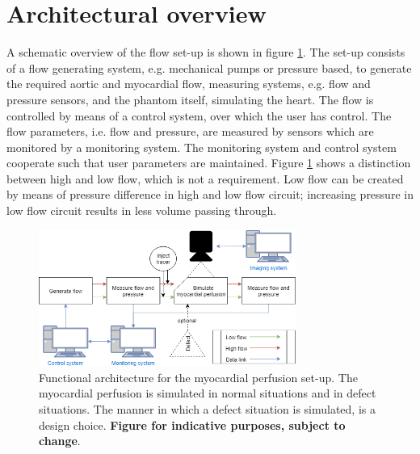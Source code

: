 \section{Architectural overview}
A schematic overview of the flow set-up is shown in figure \ref{fig:funcarch}. The set-up consists of a flow generating system, e.g. mechanical pumps or pressure based, to generate the required aortic and myocardial flow, measuring systems, e.g. flow and pressure sensors, and the phantom itself, simulating the heart. The flow is controlled by means of a control system, over which the user has control. The flow parameters, i.e. flow and pressure, are measured by sensors which are monitored by a monitoring system. The monitoring system and control system cooperate such that user parameters are maintained. Figure \ref{fig:funcarch} shows a distinction between high and low flow, which is not a requirement. Low flow can be created by means of pressure difference in high and low flow circuit; increasing pressure in low flow circuit results in less volume passing through.
\begin{figure}
	\includegraphics[width=0.75\textwidth]{./images/functional_architecture.png}
	\caption{Functional architecture for the myocardial perfusion set-up. The myocardial perfusion is simulated in normal situations and in defect situations. The manner in which a defect situation is simulated, is a design choice. \textbf{Figure for indicative purposes, subject to change}.}
	\label{fig:funcarch}
\end{figure}
